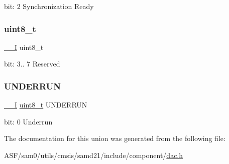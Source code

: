 bit\+: 2 Synchronization Ready \mbox{\label{union_d_a_c___i_n_t_f_l_a_g___type_a5b4208c6f4c4a4290c4f2804d1eb1d5b}} 
\subsubsection{\texorpdfstring{uint8\_t}{uint8\_t}}
{\footnotesize\ttfamily \mbox{\hyperlink{core__cm0plus_8h_af63697ed9952cc71e1225efe205f6cd3}{\+\_\+\+\_\+I}} uint8\+\_\+t}

bit\+: 3.. 7 Reserved \mbox{\label{union_d_a_c___i_n_t_f_l_a_g___type_a100468656a7f010c7bed39a72d5bf436}} 
\subsubsection{\texorpdfstring{UNDERRUN}{UNDERRUN}}
{\footnotesize\ttfamily \mbox{\hyperlink{core__cm0plus_8h_af63697ed9952cc71e1225efe205f6cd3}{\+\_\+\+\_\+I}} \mbox{\hyperlink{union_d_a_c___i_n_t_f_l_a_g___type_a5b4208c6f4c4a4290c4f2804d1eb1d5b}{uint8\+\_\+t}} U\+N\+D\+E\+R\+R\+UN}

bit\+: 0 Underrun 

The documentation for this union was generated from the following file\+:\begin{DoxyCompactItemize}
\item 
A\+S\+F/sam0/utils/cmsis/samd21/include/component/\mbox{\hyperlink{component_2dac_8h}{dac.\+h}}\end{DoxyCompactItemize}
